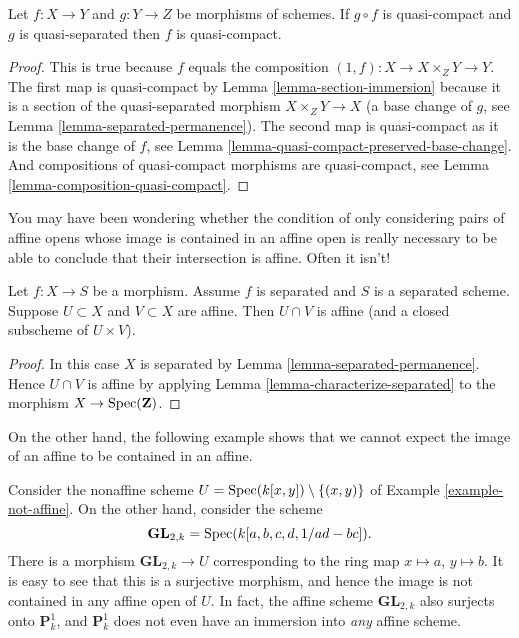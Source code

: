 \begin{lemma}
\label{lemma-quasi-compact-permanence}
Let $f : X \to Y$ and $g : Y \to Z$ be morphisms of schemes.
If $g \circ f$ is quasi-compact and $g$ is quasi-separated
then $f$ is quasi-compact.
\end{lemma}

\begin{proof}
This is true because $f$ equals the composition
$(1, f) : X \to X \times_Z Y \to Y$. The first map
is quasi-compact by Lemma \ref{lemma-section-immersion}
because it is a section of the quasi-separated morphism $X \times_Z Y \to X$
(a base change of $g$, see Lemma \ref{lemma-separated-permanence}).
The second map is quasi-compact as it
is the base change of $f$, see
Lemma \ref{lemma-quasi-compact-preserved-base-change}.
And compositions of quasi-compact
morphisms are quasi-compact, see Lemma \ref{lemma-composition-quasi-compact}.
\end{proof}

\noindent
You may have been wondering whether the condition
of only considering pairs of affine opens whose image is contained
in an affine open is really necessary to be able to conclude
that their intersection is affine. Often it isn't!

\begin{lemma}
\label{lemma-curiosity}
Let $f : X \to S$ be a morphism.
Assume $f$ is separated and $S$ is a separated scheme.
Suppose $U \subset X$ and $V \subset X$ are affine.
Then $U \cap V$ is affine (and a closed subscheme of $U \times V$).
\end{lemma}

\begin{proof}
In this case $X$ is separated by Lemma \ref{lemma-separated-permanence}.
Hence $U \cap V$ is affine by
applying Lemma \ref{lemma-characterize-separated} to the
morphism $X \to \mathop{\rm Spec}(\mathbf{Z})$.
\end{proof}

\noindent
On the other hand, the following example shows that we cannot
expect the image of an affine to be contained in an affine.

\begin{example}
\label{example-image-affine-projective}
Consider the nonaffine scheme
$U = \mathop{\rm Spec}(k[x, y]) \setminus \{(x, y)\}$ of
Example \ref{example-not-affine}. On the other hand, consider the
scheme
$$
\mathbf{GL}_{2, k} = \mathop{\rm Spec}(k[a, b, c, d, 1/ad - bc]).
$$
There is a morphism $\mathbf{GL}_{2, k} \to U$ corresponding
to the ring map $x \mapsto a$, $y \mapsto b$. It is easy to see that
this is a surjective morphism, and hence the image is not contained
in any affine open of $U$. In fact, the affine scheme
$\mathbf{GL}_{2, k}$ also surjects onto $\mathbf{P}^1_k$, and
$\mathbf{P}^1_k$ does not even have an immersion into {\it any} affine scheme.
\end{example}








